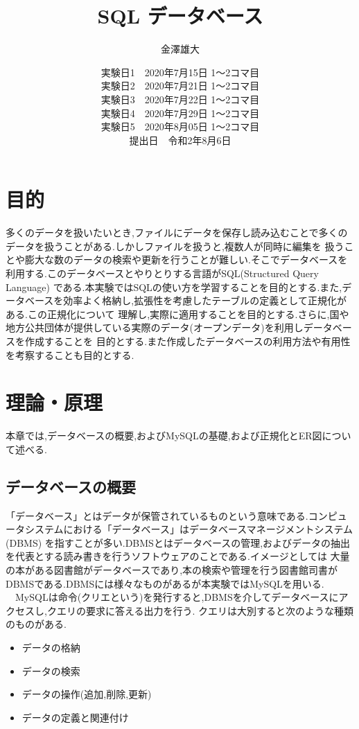 \documentclass[a4j]{jarticle}
\title{SQL データベース}
\date{実験日1　2020年7月15日 1～2コマ目 \\ 実験日2　2020年7月21日 1～2コマ目 \\ 実験日3　2020年7月22日 1～2コマ目 \\ 実験日4　2020年7月29日 1～2コマ目 \\  実験日5　2020年8月05日 1～2コマ目 \\ 提出日　令和2年8月6日}
\author{金澤雄大}
\begin{document}
    \maketitle
    \thispagestyle{empty}
    \clearpage
    \addtocounter{page}{-1}
    \section{目的}
    多くのデータを扱いたいとき,ファイルにデータを保存し読み込むことで多くのデータを扱うことがある.しかしファイルを扱うと,複数人が同時に編集を
    扱うことや膨大な数のデータの検索や更新を行うことが難しい.そこでデータベースを利用する.このデータベースとやりとりする言語がSQL(Structured Query Language)
    である.本実験ではSQLの使い方を学習することを目的とする.また,データベースを効率よく格納し,拡張性を考慮したテーブルの定義として正規化がある.この正規化について
    理解し,実際に適用することを目的とする.さらに,国や地方公共団体が提供している実際のデータ(オープンデータ)を利用しデータベースを作成することを
    目的とする.また作成したデータベースの利用方法や有用性を考察することも目的とする.
    \section{理論・原理}
    本章では,データベースの概要,およびMySQLの基礎,および正規化とER図について述べる.
    \subsection{データベースの概要}
    「データベース」とはデータが保管されているものという意味である.コンピュータシステムにおける「データベース」はデータベースマネージメントシステム(DBMS)
    を指すことが多い.DBMSとはデータベースの管理,およびデータの抽出を代表とする読み書きを行うソフトウェアのことである.イメージとしては
    大量の本がある図書館がデータベースであり,本の検索や管理を行う図書館司書がDBMSである.DBMSには様々なものがあるが本実験ではMySQLを用いる.\\
    　MySQLは命令(クリエという)を発行すると,DBMSを介してデータベースにアクセスし,クエリの要求に答える出力を行う.
    クエリは大別すると次のような種類のものがある.
    \begin{itemize}
      \item データの格納
      \item データの検索
      \item データの操作(追加,削除,更新)
      \item データの定義と関連付け
    \end{itemize}
\end{document}
